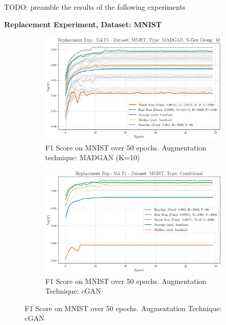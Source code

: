TODO: preamble the results of the following experiments
\newpage

\noindent\textbf{Replacement Experiment, Dataset: MNIST}
\begin{figure}[H]
	\centering
	\begin{subfigure}{.85\textwidth}
		\includegraphics[width=\textwidth]{abb/strat_classifier_performance/MNIST_STRATIFIED_CLASSIFIERS_MADGAN_NEW/replacement_experiments/val_f1_score_MADGAN_MNIST_n_gen_10_all.png}
		\caption{F1 Score on MNIST over 50 epochs. Augmentation technique: MADGAN (K=10)}
        \label{fig:res_replacement_mnist_ccgan_vs_madgan__madgan}
	\end{subfigure}
	\begin{subfigure}{.85\textwidth}
		\includegraphics[width=\textwidth]{abb/strat_classifier_performance/MNIST_STRATIFIED_CLASSIFIERS_COND_GAN/replacement_experiments/val_f1_score_['COND']_MNIST_all.png}
		\caption{F1 Score on MNIST over 50 epochs. Augmentation Technique: cGAN}
        \label{fig:res_replacement_mnist_ccgan_vs_madgan__cgan}
	\end{subfigure}
\end{figure}


